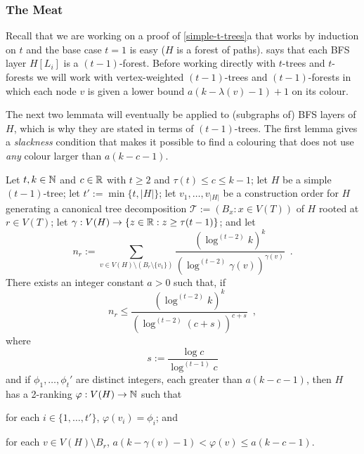\documentclass[kpfonts]{patmorin}
\newcommand{\trn}{\chi_2}
\theoremstyle{named}
\newcommand{\weirdref}[2]{\cref{#1}#2}
\begin{document}
\subsubsection{The Meat}


Recall that we are working on a proof of \weirdref{simple-t-trees}{a} that works by induction on $t$ and the base case $t=1$ is easy ($H$ is a forest of paths).  says that each BFS layer $H[L_i]$ is a $(t-1)$-forest.  Before working directly with $t$-trees and $t$-forests we will work with vertex-weighted $(t-1)$-trees and $(t-1)$-forests in which each node $v$ is given a lower bound $a(k-\lambda(v)-1)+1$ on its colour.

The next two lemmata will eventually be applied to (subgraphs of) BFS layers of $H$, which is why they are stated in terms of $(t-1)$-trees.  The first lemma gives a \emph{slackness} condition that makes it possible to find a colouring that does not use \emph{any} colour larger than $a(k-c-1)$.

\begin{lem}\label{t-tree-slack}
Let $t,k\in\mathbb{N}$ and $c\in\mathbb{R}$ with $t\ge 2$ and $\tau(t)\le c\le k-1$; let $H$ be a simple $(t-1)$-tree; let $t':=\min\{t, |H|\}$; let $v_1,\ldots,v_{|H|}$ be a construction order for $H$ generating a canonical tree decomposition $\mathcal{T}:=(B_x:x\in V(T))$ of $H$ rooted at $r\in V(T)$; let $\gamma:V(H)\to\{z\in\mathbb{R}: z\ge \tau(t-1)\}$; and let
\[
    n_r:=\sum_{v\in V(H)\setminus (B_r\setminus\{v_1\})} \frac{\left(\log^{(t-2)} k\right)^k}{\left(\log^{(t-2)} \gamma(v)\right)^{\gamma(v)}} \enspace .
\]
There exists an integer constant $a>0$ such that,
if
\begin{equation}
     n_r \le \frac{(\log^{(t-2)} k)^k}{\left(\log^{(t-2)} (c + s)\right)^{c+s}} \enspace ,
 \label{total-weight-i}
\end{equation}
where
\[
    s := \frac{\log c}{\log^{(t-1)} c}
\]
and if $\phi_1,\ldots,\phi_t'$ are distinct integers, each greater than $a(k-c-1)$,
then $H$ has a 2-ranking $\varphi:V(H)\to\mathbb{N}$ such that
\begin{compactenum}[(P1)]
    \item for each $i\in\{1,\ldots,{t'}\}$, $\varphi(v_i)=\phi_i$; and
    \item for each $v\in V(H)\setminus B_r$, $a(k-\gamma(v)-1) < \varphi(v) \le a(k-c-1)$.
\end{compactenum}
\end{lem}
\end{document}
